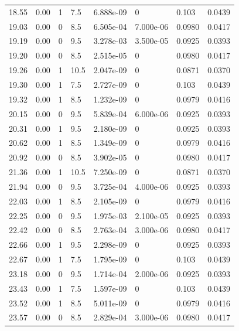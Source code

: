 \documentclass[preview]{standalone}
\begin{document}
{{{\begin{tabular}{L{1.2cm}C{1.2cm} C{0.3cm}C{0.5cm} C{1.4cm}C{1.4cm} C{1.4cm}C{1.4cm}}
  18.55  &  0.00  & 1     & 7.5 &  6.888e-09  & 0  & 0.103 &  0.0439   \\ 
  19.03  &  0.00  & 0     & 8.5 &  6.505e-04  & 7.000e-06  & 0.0980 &  0.0417   \\ 
  19.19  &  0.00  & 0     & 9.5 &  3.278e-03  & 3.500e-05  & 0.0925 &  0.0393   \\ 
  19.20  &  0.00  & 0     & 8.5 &  2.515e-05  & 0  & 0.0980 &  0.0417   \\ 
  19.26  &  0.00  & 1     & 10.5 &  2.047e-09  & 0  & 0.0871 &  0.0370   \\ 
  19.30  &  0.00  & 1     & 7.5 &  2.727e-09  & 0  & 0.103 &  0.0439   \\ 
  19.32  &  0.00  & 1     & 8.5 &  1.232e-09  & 0  & 0.0979 &  0.0416   \\ 
  20.15  &  0.00  & 0     & 9.5 &  5.839e-04  & 6.000e-06  & 0.0925 &  0.0393   \\ 
  20.31  &  0.00  & 1     & 9.5 &  2.180e-09  & 0  & 0.0925 &  0.0393   \\ 
  20.62  &  0.00  & 1     & 8.5 &  1.349e-09  & 0  & 0.0979 &  0.0416   \\ 
  20.92  &  0.00  & 0     & 8.5 &  3.902e-05  & 0  & 0.0980 &  0.0417   \\ 
  21.36  &  0.00  & 1     & 10.5 &  7.250e-09  & 0  & 0.0871 &  0.0370   \\ 
  21.94  &  0.00  & 0     & 9.5 &  3.725e-04  & 4.000e-06  & 0.0925 &  0.0393   \\ 
  22.03  &  0.00  & 1     & 8.5 &  2.105e-09  & 0  & 0.0979 &  0.0416   \\ 
  22.25  &  0.00  & 0     & 9.5 &  1.975e-03  & 2.100e-05  & 0.0925 &  0.0393   \\ 
  22.42  &  0.00  & 0     & 8.5 &  2.763e-04  & 3.000e-06  & 0.0980 &  0.0417   \\ 
  22.66  &  0.00  & 1     & 9.5 &  2.298e-09  & 0  & 0.0925 &  0.0393   \\ 
  22.67  &  0.00  & 1     & 7.5 &  1.795e-09  & 0  & 0.103 &  0.0439   \\ 
  23.18  &  0.00  & 0     & 9.5 &  1.714e-04  & 2.000e-06  & 0.0925 &  0.0393   \\ 
  23.43  &  0.00  & 1     & 7.5 &  1.597e-09  & 0  & 0.103 &  0.0439   \\ 
  23.52  &  0.00  & 1     & 8.5 &  5.011e-09  & 0  & 0.0979 &  0.0416   \\ 
  23.57  &  0.00  & 0     & 8.5 &  2.829e-04  & 3.000e-06  & 0.0980 &  0.0417   \\ 

\end{tabular}}}}
\end{document}
